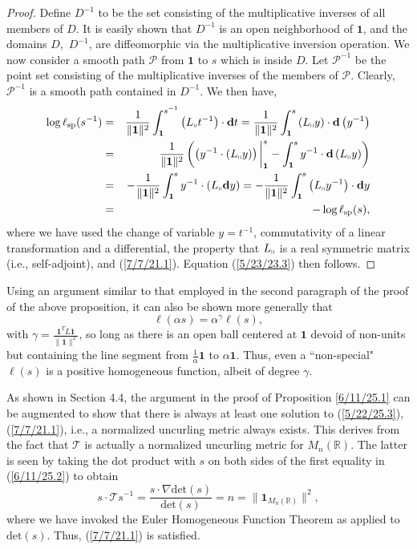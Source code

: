 \documentclass{amsart}
\theoremstyle{definition}
\numberwithin{theorem}{section}
\numberwithin{equation}{section}
\begin{document}
\begin{proof}
Define $D^{-1}$ to be the set consisting of the multiplicative inverses of all members of $D$.  It is easily shown that $D^{-1}$ is an open neighborhood of $\mathbf{1}$, and the domains \mbox{$D$, $D^{-1}$}, are diffeomorphic via the multiplicative inversion operation.  
We now consider a smooth path $\mathcal{P}$ from $\mathbf{1}$ to $s$ which is inside $D$.  Let $\mathcal{P}^{-1}$ be the point set consisting of the multiplicative inverses of the members of $\mathcal{P}$.  Clearly, $\mathcal{P}^{-1}$ is a smooth path contained in $D^{-1}$.  
 We then have, 
\begin{eqnarray}  \log \ell_{\rm sp}(s^{-1})   &=&   \frac{1}{\|{\bf 1}\|^2} \int_{\bf 1}^{s^{-1}} \left(L_{\shortparallel}t^{-1}\right) \cdot \mathbf{d}t \nonumber =  \frac{1}{\|{\bf 1}\|^2} \int_{\bf 1}^s \left(L_{\shortparallel}y\right)\cdot \mathbf{d}\left(y^{-1}\right) \nonumber \\ &=&  \frac{1}{\|{\bf 1}\|^2}\left(\left(y^{-1}\cdot \left(L_{\shortparallel}y\right)\right)\bigg|_{\bf 1}^s - \int_{\bf 1}^s y^{-1}\cdot \mathbf{d}\left(L_{\shortparallel}y\right)\right)   \nonumber \\ &=& -\frac{1}{\|{\bf 1}\|^2} \int_{\bf 1}^s y^{-1}\cdot (L_{\shortparallel}\mathbf{d}y) = -\frac{1}{\|{\bf 1}\|^2} \int_{\bf 1}^s \left(L_{\shortparallel}y^{-1}\right) \cdot \mathbf{d}y  \nonumber \\ &=& -\log \ell_{\rm sp}(s),\label{4/2/23.5} \end{eqnarray} where we have used the change of variable $y=t^{-1}$, commutativity of a linear transformation and a differential, the property that $L_{\shortparallel}$ is a real symmetric matrix (i.e., self-adjoint), and  (\ref{7/7/21.1}).  Equation (\ref{5/23/23.3}) then follows.
\end{proof}

Using an argument similar to that employed in the second paragraph of the proof of the above proposition, it can also be shown more generally that  \[  \ell(\alpha s) = \alpha^\gamma \ell(s),\] with $\gamma = \frac{\mathbf{1}^T L \mathbf{1}}{\|\mathbf{1}\|^2}$, so long as there is an open ball centered at $\mathbf{1}$ devoid of non-units but containing the line segment from $\frac{1}{\alpha}\mathbf{1}$  to $\alpha\mathbf{1}$.  Thus, even a ``non-special" $ \ell(s)$ is a positive homogeneous function, albeit of degree $\gamma$.  


As shown in Section 4.4, the argument in the proof of Proposition \ref{6/11/25.1} can be augmented to show that there is always at least one solution to (\ref{5/22/25.3}), (\ref{7/7/21.1}), i.e.,  a normalized uncurling metric always exists.  This derives from the fact that $\mathcal{T}$ is actually a normalized uncurling metric for $M_n(\mathbb{R})$.  The latter is seen by taking the dot product with $s$ on both sides of the first equality in (\ref{6/11/25.2}) to obtain
\begin{equation}\label{9/15/25.1}s\cdot\mathcal{T}s^{-1} = \frac{s\cdot\nabla\text{det}(s)}{\text{det}(s)} = n = \|\mathbf{1}_{M_n(\mathbb{R})}\|^2,\end{equation} 
where we have invoked the Euler Homogeneous Function Theorem as applied to $\text{det}(s)$.    Thus, (\ref{7/7/21.1}) is satisfied.   
\end{document}
